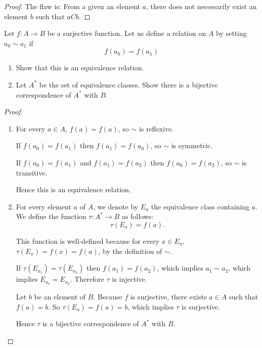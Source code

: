 \begin{proof}
    The flaw is: From a given an element $a$, there does not necessarily exist an element $b$ such that $aCb$.
\end{proof}

\begin{exercise}\label{chapter1:section3:exercise4}
    Let $f: A\to B$ be a surjective function. Let us define a relation on $A$ by setting $a_{0}\sim a_{1}$ if
    \[
        f(a_{0}) = f(a_{1})
    \]

    \begin{enumerate}[label={(\alph*)}]
        \item Show that this is an equivalence relation.
        \item Let $A^{*}$ be the set of equivalence classes. Show there is a bijective correspondence of $A^{*}$ with $B$.
    \end{enumerate}
\end{exercise}

\begin{proof}
    \begin{enumerate}[label={(\alph*)}]
        \item For every $a\in A$, $f(a) = f(a)$, so $\sim$ is reflexive.

              If $f(a_{0}) = f(a_{1})$ then $f(a_{1}) = f(a_{0})$, so $\sim$ is symmetric.

              If $f(a_{0}) = f(a_{1})$ and $f(a_{1}) = f(a_{2})$ then $f(a_{0}) = f(a_{2})$, so $\sim$ is transitive.

              Hence this is an equivalence relation.
        \item For every element $a$ of $A$, we denote by $E_{a}$ the equivalence class containing $a$. We define the function $\tau: A^{*}\to B$ as follows:
              \[
                  \tau(E_{a}) = f(a).
              \]

              This function is well-defined because for every $x\in E_{a}$, $\tau(E_{x}) = f(x) = f(a)$, by the definition of $\sim$.

              If $\tau(E_{a_{1}}) = \tau(E_{a_{2}})$ then $f(a_{1}) = f(a_{2})$, which implies $a_{1}\sim a_{2}$, which implies $E_{a_{1}} = E_{a_{2}}$. Therefore $\tau$ is injective.

              Let $b$ be an element of $B$. Because $f$ is surjective, there exists $a\in A$ such that $f(a) = b$. So $\tau(E_{a}) = f(a) = b$, which implies $\tau$ is surjective.

              Hence $\tau$ is a bijective correspondence of $A^{*}$ with $B$.
    \end{enumerate}
\end{proof}


